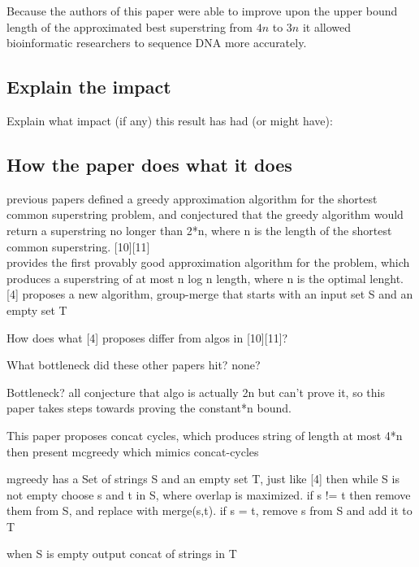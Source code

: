 \documentclass[letterpaper,twocolumn,12pt]{article}
\begin{document}
Because the authors of this paper were able to improve upon the upper bound length of the approximated best superstring from $4n$ to $3n$ it allowed bioinformatic researchers to sequence DNA more accurately. 



\subsection*{Explain the impact}
Explain what impact (if any) this result has had (or might have):

\subsection*{How the paper does what it does}

previous papers defined a greedy approximation algorithm for the shortest common superstring
problem, and conjectured that the greedy algorithm would return a superstring no longer than 
2*n, where n is the length of the shortest common superstring.  [10][11]
\\
[4] provides the first provably good approximation algorithm for the problem, which produces
a superstring of at most n log n length, where n is the optimal lenght.
[4] proposes a new algorithm, group-merge that starts with
an input set S and an empty set T

How does what [4] proposes differ from algos in [10][11]?

What bottleneck did these other papers hit?
none?

Bottleneck?  all conjecture that algo is actually 2n but can't prove it, so this paper
takes steps towards proving the constant*n bound.

This paper proposes concat cycles, which produces string of length at most 4*n
then present mcgreedy which mimics concat-cycles

mgreedy has a Set of strings S and an empty set T, just like [4]
then while S is not empty choose s and t in S, where overlap is maximized.  if s != t
then remove them from S, and replace with merge(s,t).  if s = t, remove s from S and add it to T

when S is empty output concat of strings in T


{
  \small 
  
  
}
\end{document}
